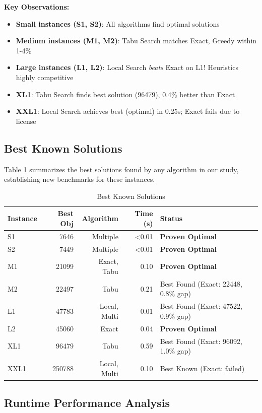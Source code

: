 \documentclass[11pt,a4paper]{article}
\begin{document}
\textbf{Key Observations:}
\begin{itemize}
  \item \textbf{Small instances (S1, S2)}: All algorithms find optimal solutions
  \item \textbf{Medium instances (M1, M2)}: Tabu Search matches Exact, Greedy within 1-4\%
  \item \textbf{Large instances (L1, L2)}: Local Search \textit{beats} Exact on L1! Heuristics highly competitive
  \item \textbf{XL1}: Tabu Search finds best solution (96479), 0.4\% better than Exact
  \item \textbf{XXL1}: Local Search achieves best (optimal) in 0.25s; Exact fails due to license
\end{itemize}

\subsection{Best Known Solutions}

Table \ref{tab:best-known} summarizes the best solutions found by any algorithm in our study, establishing new benchmarks for these instances.

\begin{table}[htbp]
\centering
\caption{Best Known Solutions}
\label{tab:best-known}
\begin{tabular}{lrrrl}
\toprule
Instance & Best Obj & Algorithm & Time (s) & Status \\
\midrule
S1 & 7646 & Multiple & <0.01 & \textbf{Proven Optimal} \\
S2 & 7449 & Multiple & <0.01 & \textbf{Proven Optimal} \\
M1 & 21099 & Exact, Tabu & 0.10 & \textbf{Proven Optimal} \\
M2 & 22497 & Tabu & 0.21 & Best Found (Exact: 22448, 0.8\% gap) \\
L1 & 47783 & Local, Multi & 0.01 & Best Found (Exact: 47522, 0.9\% gap) \\
L2 & 45060 & Exact & 0.04 & \textbf{Proven Optimal} \\
XL1 & 96479 & Tabu & 0.59 & Best Found (Exact: 96092, 1.0\% gap) \\
XXL1 & 250788 & Local, Multi & 0.10 & Best Known (Exact: failed) \\
\bottomrule
\end{tabular}
\end{table}

\subsection{Runtime Performance Analysis}
\end{document}
